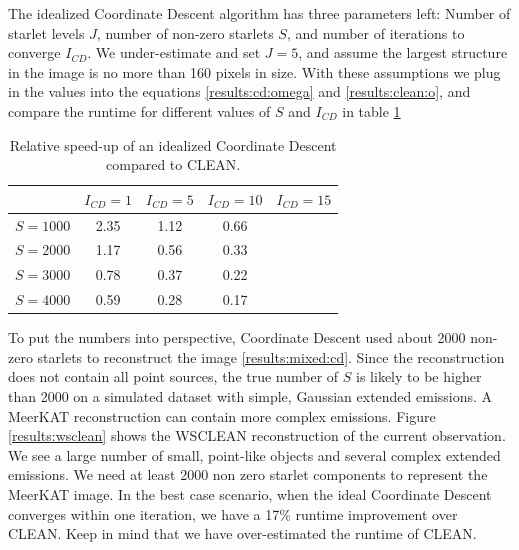 The idealized Coordinate Descent algorithm has three parameters left: Number of starlet levels $J$, number of non-zero starlets $S$, and number of iterations to converge $I_{CD}$. We under-estimate and set $J=5$, and assume the largest structure in the image is no more than 160 pixels in size. With these assumptions we plug in the values into the equations \eqref{results:cd:omega} and \eqref{results:clean:o}, and compare the runtime for different values of $S$ and $I_{CD}$ in table \ref{res:cd:table}

\begin{table}[h!]
	\begin{center}
		\begin{tabular}{l|c|c|c|c} %
			 & $I_{CD} = 1$ & $I_{CD} = 5$ &  $I_{CD} = 10$ &  $I_{CD} = 15$\\
			\hline
			$S=1000$ & 2.35 & 1.12 & 0.66 & \\
			$S=2000$ & 1.17 & 0.56 & 0.33 &\\
			$S=3000$ & 0.78 & 0.37 & 0.22 &\\
			$S=4000$ & 0.59 & 0.28 & 0.17 & \\
		\end{tabular}
		\caption{Relative speed-up of an idealized Coordinate Descent compared to CLEAN.}
		\label{res:cd:table}
	\end{center}
\end{table}

To put the numbers into perspective, Coordinate Descent used about 2000 non-zero starlets to reconstruct the image \ref{results:mixed:cd}. Since the reconstruction does not contain all point sources, the true number of $S$ is likely to be higher than 2000 on a simulated dataset with simple, Gaussian extended emissions. A MeerKAT reconstruction can contain more complex emissions. Figure \ref{results:wsclean} shows the WSCLEAN reconstruction of the current observation. We see a large number of small, point-like objects and several complex extended emissions. We need at least 2000 non zero starlet components to represent the MeerKAT image. In the best case scenario, when the ideal Coordinate Descent converges within one iteration, we have a 17\% runtime improvement over CLEAN. Keep in mind that we have over-estimated the runtime of CLEAN.

